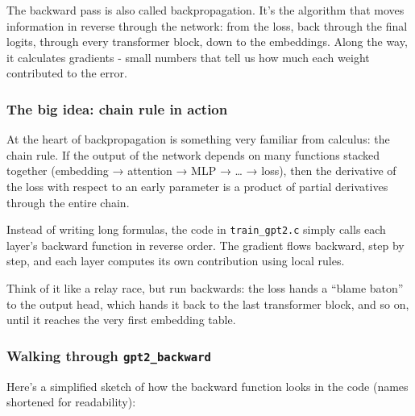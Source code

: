 \documentclass[
  letterpaper,
  DIV=11,
  numbers=noendperiod]{scrreprt}
\begin{document}
The backward pass is also called backpropagation. It's the algorithm
that moves information in reverse through the network: from the loss,
back through the final logits, through every transformer block, down to
the embeddings. Along the way, it calculates gradients - small numbers
that tell us how much each weight contributed to the error.

\subsubsection{The big idea: chain rule in
action}\label{the-big-idea-chain-rule-in-action}

At the heart of backpropagation is something very familiar from
calculus: the chain rule. If the output of the network depends on many
functions stacked together (embedding → attention → MLP → \ldots{} →
loss), then the derivative of the loss with respect to an early
parameter is a product of partial derivatives through the entire chain.

Instead of writing long formulas, the code in \texttt{train\_gpt2.c}
simply calls each layer's backward function in reverse order. The
gradient flows backward, step by step, and each layer computes its own
contribution using local rules.

Think of it like a relay race, but run backwards: the loss hands a
``blame baton'' to the output head, which hands it back to the last
transformer block, and so on, until it reaches the very first embedding
table.

\subsubsection{\texorpdfstring{Walking through
\texttt{gpt2\_backward}}{Walking through gpt2\_backward}}\label{walking-through-gpt2_backward}

Here's a simplified sketch of how the backward function looks in the
code (names shortened for readability):
\end{document}
